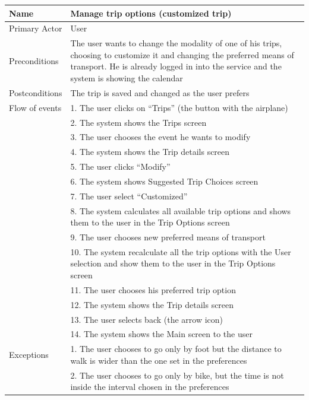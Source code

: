 \begin{center}
\def\arraystretch{1.162}
  \begin{tabular}{ | l | p{} | }
    \hline
    Name & Manage trip options (customized trip) \\ \hline
    Primary Actor & User \\ \hline
    Preconditions & The user wants to change the modality of one of his trips, choosing to customize it and changing the preferred means of transport. He is already logged in into the service and the system is showing the calendar \\ \hline
    Postconditions & The trip is saved and changed as the user prefers \\ \hline
    Flow of events  & 1.	The user clicks on “Trips” (the button with the airplane) \\
					& 2.	The system shows the Trips screen \\
					& 3.	The user chooses the event he wants to modify \\
					& 4.	The system shows the Trip details screen \\
					& 5.	The user clicks “Modify” \\
					& 6.	The system shows Suggested Trip Choices screen \\
					& 7.	The user select “Customized” \\
					& 8.	The system calculates all available trip options and shows them to the user in the Trip Options screen \\
					& 9.	The user chooses new preferred means of transport \\
					& 10.	The system recalculate all the trip options with the User selection and show them to the user in the Trip Options screen \\
					& 11.	The user chooses his preferred trip option \\
					& 12.	The system shows the Trip details screen \\
					& 13.	The user selects back (the arrow icon) \\
					& 14.	The system shows the Main screen to the user
\\
 \hline
    Exceptions  & 1.	The user chooses to go only by foot but the distance to walk is wider than the one set in the preferences \\
				& 2.	The user chooses to go only by bike, but the time is not inside the interval chosen in the preferences
 \\
 \hline
  \end{tabular}
\end{center}

